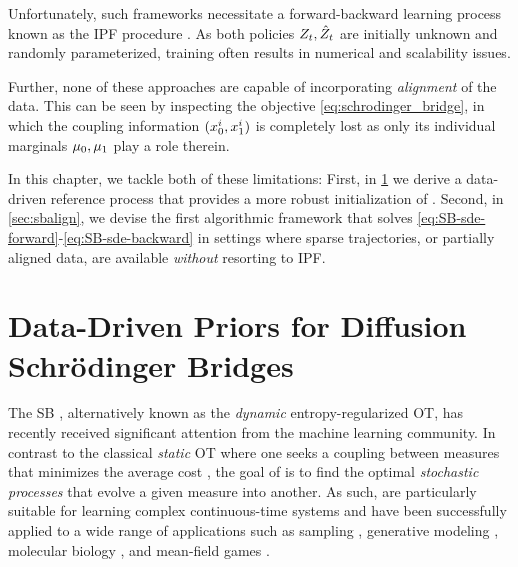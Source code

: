 Unfortunately, such frameworks necessitate a forward-backward learning process known as the \acrfull{IPF} procedure \citep{fortet1940resolution, kullback1968probability}.
As both policies $Z_t, \hat{Z}_t$ are initially unknown and randomly parameterized, training  often results in numerical and scalability issues.

Further, none of these approaches are capable of incorporating \emph{alignment} of the data. This can be seen by inspecting the objective \eqref{eq:schrodinger_bridge}, in which the coupling information $(x_0^i,x_1^i)$ is completely lost as only its individual marginals $\mu_0,\mu_1$ play a role therein.  

In this chapter, we tackle both of these limitations: First, in \cref{sec:gsbflow} we derive a data-driven reference process that provides a more robust initialization of . Second, in \cref{sec:sbalign}, we devise the first algorithmic framework that solves \eqref{eq:SB-sde-forward}-\eqref{eq:SB-sde-backward} in settings where sparse trajectories, or partially aligned data, are available \emph{without} resorting to \acrshort{IPF}.

\section{Data-Driven Priors for Diffusion Schr\"odinger Bridges} \label{sec:gsbflow}

The \acrlong{SB} \citep{leonard2013survey, chen2021stochastic}, alternatively known as the \emph{dynamic} entropy-regularized \acrlong{OT}, has recently received significant attention from the machine learning community. In contrast to the classical \emph{static} \acrshort{OT} where one seeks a coupling between measures that minimizes the average cost \citep{villani2009optimal,peyre2019computational}, the goal of  is to find the optimal \emph{stochastic processes} that evolve a given measure into another. As such,  are particularly suitable for learning complex continuous-time systems and have been successfully applied to a wide range of applications such as sampling \citep{bernton2019schr, huang2021schrodinger}, generative modeling \citep{chen2021likelihood,de2021diffusion,wang2021deep}, molecular biology \citep{holdijk2022path}, and mean-field games \citep{liu2022deep}. 


